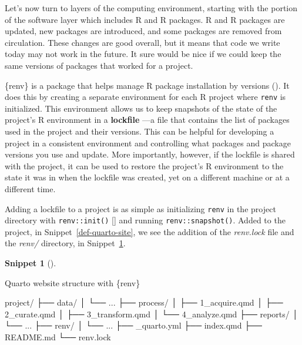 \documentclass[
  letterpaper,
  krantz1]{latex/krantz-mod}
\newenvironment{Shaded}{\begin{snugshade}}{\end{snugshade}}
\newcommand{\ExtensionTok}[1]{\textcolor[rgb]{0.00,0.00,0.00}{#1}}
\newcommand{\NormalTok}[1]{\textcolor[rgb]{0.00,0.00,0.00}{#1}}
\newcommand{\cindex}[1]{%
  \StrSubstitute{#1}{_}{\_}[\temp]%
  \index{\temp}%
}
\theoremstyle{definition}
\newtheorem{definition}{Snippet}[chapter]
\theoremstyle{definition}
\theoremstyle{remark}
\begin{document}
Let's now turn to layers of the computing environment, starting with the
portion of the software layer which includes R and R packages.
R and R packages are updated, new packages
are introduced, and some packages are removed from circulation. These
changes are good overall, but it means that code we write today may not
work in the future. It sure would be nice if we could keep the same
versions of packages that worked for a project.

\{renv\} is a package that helps manage R package installation by
versions (). It does this
by creating a separate environment for each R project where
\texttt{renv} is initialized. This environment allows us to keep
snapshots of the state of the project's R environment in a
\textbf{lockfile} ---a file that contains the list of
packages used in the project and their versions. This can be helpful for
developing a project in a consistent environment and controlling what
packages and package versions you use and update. More importantly,
however, if the lockfile is shared with the project, it can be used to
restore the project's R environment to the state it was in when the
lockfile was created, yet on a different machine or at a different time.

Adding a lockfile to a project is as simple as initializing
\texttt{renv} in the project directory with
\texttt{renv::init()}\cindex{::} and running \texttt{renv::snapshot()}.
Added to the project, in Snippet~\ref{def-quarto-site}, we see the
addition of the \emph{renv.lock} file and the \emph{renv/} directory, in
Snippet~\ref{def-quarto-renv}.

\begin{definition}[]\protect\hypertarget{def-quarto-renv}{}\label{def-quarto-renv}

Quarto website structure with \{renv\}

\begin{Shaded}
\begin{Highlighting}[]
\ExtensionTok{project/}
  \ExtensionTok{├──}\NormalTok{ data/}
  \ExtensionTok{│}\NormalTok{   └── ...}
  \ExtensionTok{├──}\NormalTok{ process/}
  \ExtensionTok{│}\NormalTok{   ├── 1\_acquire.qmd}
  \ExtensionTok{│}\NormalTok{   ├── 2\_curate.qmd}
  \ExtensionTok{│}\NormalTok{   ├── 3\_transform.qmd}
  \ExtensionTok{│}\NormalTok{   └── 4\_analyze.qmd}
  \ExtensionTok{├──}\NormalTok{ reports/}
  \ExtensionTok{│}\NormalTok{   └── ...}
  \ExtensionTok{├──}\NormalTok{ renv/}
  \ExtensionTok{│}\NormalTok{   └── ...}
  \ExtensionTok{├──}\NormalTok{ \_quarto.yml}
  \ExtensionTok{├──}\NormalTok{ index.qmd}
  \ExtensionTok{├──}\NormalTok{ README.md}
  \ExtensionTok{└──}\NormalTok{ renv.lock}
\end{Highlighting}
\end{Shaded}

\end{definition}
\end{document}
